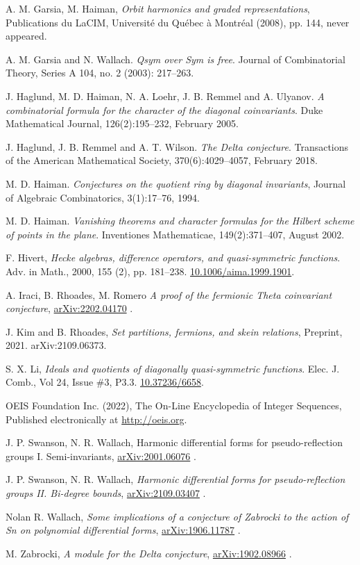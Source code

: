 \documentclass[11pt]{amsart}
\theoremstyle{definition}
\numberwithin{equation}{section}
\begin{document}
\begin{thebibliography}{999}
 A. M. Garsia, M. Haiman,
\textit{Orbit harmonics and graded representations},
Publications du LaCIM, Universit\'e du Qu\'ebec \`a Montr\'eal (2008), pp. 144,
never appeared.

 A. M. Garsia and N. Wallach.
\textit{Qsym over Sym is free}.
Journal of Combinatorial Theory, Series A 104, no. 2 (2003): 217--263.

 J. Haglund, M. D. Haiman, N. A. Loehr, J. B. Remmel and A. Ulyanov.
\textit{A combinatorial formula for the character of the diagonal coinvariants}.
Duke Mathematical Journal, 126(2):195--232, February 2005.

 J. Haglund, J. B. Remmel and A. T. Wilson.
\textit{The Delta conjecture}.
Transactions of the American Mathematical Society, 370(6):4029--4057, February 2018.

 M. D. Haiman.
\textit{Conjectures on the quotient ring by diagonal invariants},
Journal of Algebraic Combinatorics, 3(1):17--76, 1994.

 M. D. Haiman.
\textit{Vanishing theorems and character formulas for the Hilbert scheme of points in the plane}.
Inventiones Mathematicae, 149(2):371--407, August 2002.

 F. Hivert,
\textit{Hecke algebras, difference operators, and quasi-symmetric functions}.
Adv. in Math., 2000, 155 (2), pp. 181--238.
\href{https://doi-org/10.1006/aima.1999.1901}{10.1006/aima.1999.1901}.

 A. Iraci, B. Rhoades, M. Romero
\textit{A proof of the fermionic Theta coinvariant conjecture},
\href{https://arxiv.org/abs/2202.04170}{arXiv:2202.04170} .

 J. Kim and B. Rhoades,
\textit{Set partitions, fermions, and skein relations}, Preprint, 2021. arXiv:2109.06373.

 S. X. Li,
\textit{Ideals and quotients of diagonally quasi-symmetric functions}.
Elec. J. Comb., Vol 24, Issue \#3, P3.3.
\href{https://doi.org/10.37236/6658}{10.37236/6658}.

 OEIS Foundation Inc. (2022),
The On-Line Encyclopedia of Integer Sequences, Published electronically at
\href{http://oeis.org}{http://oeis.org}.

 J. P. Swanson, N. R. Wallach,
Harmonic differential forms for pseudo-reflection groups I. Semi-invariants,
\href{https://arxiv.org/abs/2001.06076}{arXiv:2001.06076} .


 J. P. Swanson, N. R. Wallach,
\textit{Harmonic differential forms for pseudo-reflection groups II. Bi-degree bounds},
\href{https://arxiv.org/abs/2109.03407}{arXiv:2109.03407} .


 Nolan R. Wallach,
\textit{Some implications of a conjecture of Zabrocki
to the action of Sn on polynomial differential forms},
\href{https://arxiv.org/abs/1906.11787}{arXiv:1906.11787} .

 M. Zabrocki,
\textit{A module for the Delta conjecture},
\href{https://arxiv.org/abs/1902.08966}{arXiv:1902.08966} .


\end{thebibliography}
\end{document}
